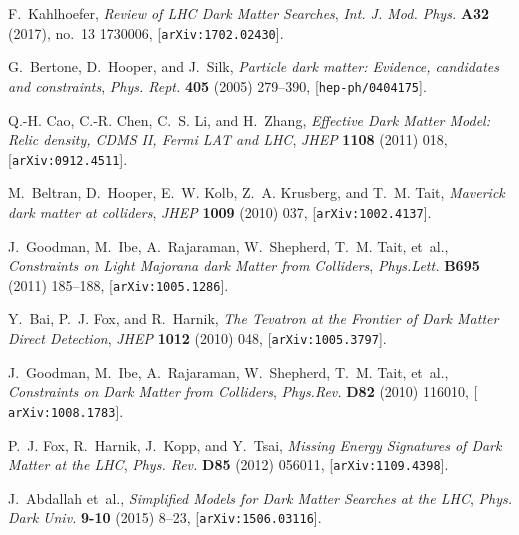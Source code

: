 \documentclass[a4paper, 11pt,notoc]{article}
\begin{document}
\providecommand{\href}[2]{#2}\begingroup\raggedright\begin{thebibliography}{100}

F.~Kahlhoefer, {\it {Review of LHC Dark Matter Searches}},  {\em Int. J. Mod.
  Phys.} {\bf A32} (2017), no.~13 1730006,
  [\href{http://arxiv.org/abs/1702.02430}{{\tt arXiv:1702.02430}}].

G.~Bertone, D.~Hooper, and J.~Silk, {\it {Particle dark matter: Evidence,
  candidates and constraints}},  {\em Phys. Rept.} {\bf 405} (2005) 279--390,
  [\href{http://arxiv.org/abs/hep-ph/0404175}{{\tt hep-ph/0404175}}].

Q.-H. Cao, C.-R. Chen, C.~S. Li, and H.~Zhang, {\it {Effective Dark Matter
  Model: Relic density, CDMS II, Fermi LAT and LHC}},  {\em JHEP} {\bf 1108}
  (2011) 018, [\href{http://arxiv.org/abs/0912.4511}{{\tt arXiv:0912.4511}}].

M.~Beltran, D.~Hooper, E.~W. Kolb, Z.~A. Krusberg, and T.~M. Tait, {\it
  {Maverick dark matter at colliders}},  {\em JHEP} {\bf 1009} (2010) 037,
  [\href{http://arxiv.org/abs/1002.4137}{{\tt arXiv:1002.4137}}].

J.~Goodman, M.~Ibe, A.~Rajaraman, W.~Shepherd, T.~M. Tait, et~al., {\it
  {Constraints on Light Majorana dark Matter from Colliders}},  {\em
  Phys.Lett.} {\bf B695} (2011) 185--188,
  [\href{http://arxiv.org/abs/1005.1286}{{\tt arXiv:1005.1286}}].

Y.~Bai, P.~J. Fox, and R.~Harnik, {\it {The Tevatron at the Frontier of Dark
  Matter Direct Detection}},  {\em JHEP} {\bf 1012} (2010) 048,
  [\href{http://arxiv.org/abs/1005.3797}{{\tt arXiv:1005.3797}}].

J.~Goodman, M.~Ibe, A.~Rajaraman, W.~Shepherd, T.~M. Tait, et~al., {\it
  {Constraints on Dark Matter from Colliders}},  {\em Phys.Rev.} {\bf D82}
  (2010) 116010, [\href{http://arxiv.org/abs/1008.1783}{{\tt
  arXiv:1008.1783}}].

P.~J. Fox, R.~Harnik, J.~Kopp, and Y.~Tsai, {\it {Missing Energy Signatures of
  Dark Matter at the LHC}},  {\em Phys. Rev.} {\bf D85} (2012) 056011,
  [\href{http://arxiv.org/abs/1109.4398}{{\tt arXiv:1109.4398}}].

J.~Abdallah et~al., {\it {Simplified Models for Dark Matter Searches at the
  LHC}},  {\em Phys. Dark Univ.} {\bf 9-10} (2015) 8--23,
  [\href{http://arxiv.org/abs/1506.03116}{{\tt arXiv:1506.03116}}].


\end{thebibliography}
\end{document}
